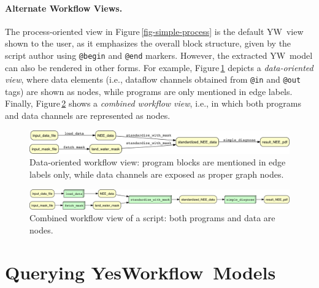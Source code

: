 \documentclass{article}
\newcommand{\yw}{\textsf{YW}}
\newcommand{\YWT}{\textsf{YesWorkflow}}
\newcommand{\ywa}[1]{\texttt{#1}}
\newcommand{\figref}[1]{Figure\,\ref{#1}}
\begin{document}
\paragraph{Alternate Workflow Views.}
The process-oriented view in \figref{fig-simple-process} is the
default \yw\ view shown to the user, as it emphasizes the overall
block structure, given by the script author using \ywa{@begin} and
\ywa{@end} markers.  However, the extracted \yw\ model can also be
rendered in other forms.  For example, \figref{fig-simple-data}
depicts a \emph{data-oriented view}, where data elements (i.e.,
dataflow channels obtained from \ywa{@in} and \ywa{@out} tags) are
shown as nodes, while programs are only mentioned in edge labels.
Finally, \figref{fig-simple-combined} shows a \emph{combined workflow
  view}, i.e., in which both programs and data channels are
represented as nodes.

 \begin{figure}[h]
   \centering
   \includegraphics[width=1.0\textwidth]{figures/example_data-crop.pdf}
   \caption{Data-oriented workflow view: program blocks are mentioned
     in edge labels only, while data channels are exposed as proper
     graph nodes.}
   \label{fig-simple-data}
 \end{figure}

 \begin{figure}[h]
   \centering
   \includegraphics[width=1.0\textwidth]{figures/example_comb-crop.pdf}
   \caption{Combined workflow view of a script: both programs and data
   are nodes.}
   \label{fig-simple-combined}
 \end{figure}



\section{Querying \YWT\ Models}\label{sec-querying}
\end{document}
